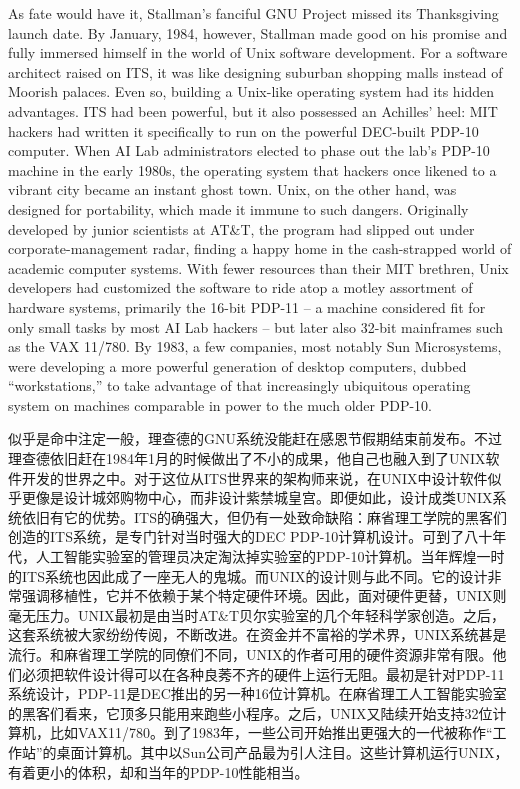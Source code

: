 \ifdefined\eng
As fate would have it, Stallman's fanciful GNU Project missed its Thanksgiving launch date. By January, 1984, however, Stallman made good on his promise and fully immersed himself in the world of Unix software development. For a software architect raised on ITS, it was like designing suburban shopping malls instead of Moorish palaces. Even so, building a Unix-like operating system had its hidden advantages. ITS had been powerful, but it also possessed an Achilles' heel: MIT hackers had written it specifically to run on the powerful DEC-built PDP-10 computer. When AI Lab administrators elected to phase out the lab's PDP-10 machine in the early 1980s, the operating system that hackers once likened to a vibrant city became an instant ghost town. Unix, on the other hand, was designed for portability, which made it immune to such dangers. Originally developed by junior scientists at AT\&T, the program had slipped out under corporate-management radar, finding a happy home in the cash-strapped world of academic computer systems. With fewer resources than their MIT brethren, Unix developers had customized the software to ride atop a motley assortment of hardware systems, primarily the 16-bit PDP-11 -- a machine considered fit for only small tasks by most AI Lab hackers -- but later also 32-bit mainframes such as the VAX 11/780. By 1983, a few companies, most notably Sun Microsystems, were developing a more powerful generation of desktop computers, dubbed ``workstations,'' to take advantage of that increasingly ubiquitous operating system on machines comparable in power to the much older PDP-10.
\fi

\ifdefined\chs
似乎是命中注定一般，理查德的GNU系统没能赶在感恩节假期结束前发布。不过理查德依旧赶在1984年1月的时候做出了不小的成果，他自己也融入到了UNIX软件开发的世界之中。对于这位从ITS世界来的架构师来说，在UNIX中设计软件似乎更像是设计城郊购物中心，而非设计紫禁城皇宫。即便如此，设计成类UNIX系统依旧有它的优势。ITS的确强大，但仍有一处致命缺陷：麻省理工学院的黑客们创造的ITS系统，是专门针对当时强大的DEC PDP-10计算机设计。可到了八十年代，人工智能实验室的管理员决定淘汰掉实验室的PDP-10计算机。当年辉煌一时的ITS系统也因此成了一座无人的鬼城。而UNIX的设计则与此不同。它的设计非常强调移植性，它并不依赖于某个特定硬件环境。因此，面对硬件更替，UNIX则毫无压力。UNIX最初是由当时AT\&T贝尔实验室的几个年轻科学家创造。之后，这套系统被大家纷纷传阅，不断改进。在资金并不富裕的学术界，UNIX系统甚是流行。和麻省理工学院的同僚们不同，UNIX的作者可用的硬件资源非常有限。他们必须把软件设计得可以在各种良莠不齐的硬件上运行无阻。最初是针对PDP-11系统设计，PDP-11是DEC推出的另一种16位计算机。在麻省理工人工智能实验室的黑客们看来，它顶多只能用来跑些小程序。之后，UNIX又陆续开始支持32位计算机，比如VAX11/780。到了1983年，一些公司开始推出更强大的一代被称作``工作站''的桌面计算机。其中以Sun公司产品最为引人注目。这些计算机运行UNIX，有着更小的体积，却和当年的PDP-10性能相当。
\fi

